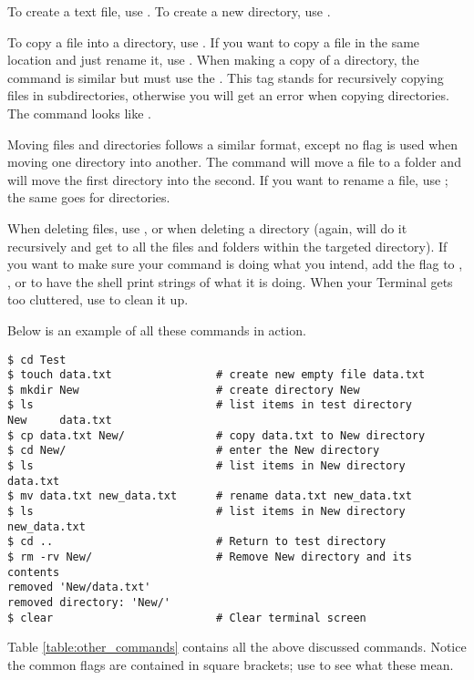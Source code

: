 To create a text file, use .
To create a new directory, use .

To copy a file into a directory, use .
If you want to copy a file in the same location and just rename it, use .
When making a copy of a directory, the command is similar but must use the .
This tag stands for recursively copying files in subdirectories, otherwise you will get an error when copying directories.
The command looks like .

Moving files and directories follows a similar format, except no  flag is used when moving one directory into another.
The command  will move a file to a folder and  will move the first directory into the second.
If you want to rename a file, use ; the same goes for directories.

When deleting files, use , or  when deleting a directory (again,  will do it recursively and get to all the files and folders within the targeted directory).
If you want to make sure your command is doing what you intend, add the  flag to , , or  to have the shell print strings of what it is doing.
When your Terminal gets too cluttered, use  to clean it up.

Below is an example of all these commands in action.
\begin{lstlisting}
$ cd Test
$ touch data.txt				# create new empty file data.txt
$ mkdir New						# create directory New
$ ls							# list items in test directory
New 	data.txt
$ cp data.txt New/				# copy data.txt to New directory
$ cd New/						# enter the New directory
$ ls							# list items in New directory
data.txt
$ mv data.txt new_data.txt		# rename data.txt new_data.txt
$ ls							# list items in New directory
new_data.txt
$ cd ..							# Return to test directory
$ rm -rv New/					# Remove New directory and its contents
removed 'New/data.txt'
removed directory: 'New/'
$ clear							# Clear terminal screen
\end{lstlisting}

Table \ref{table:other_commands} contains all the above discussed commands.
Notice the common flags are contained in square brackets; use  to see what these mean.

